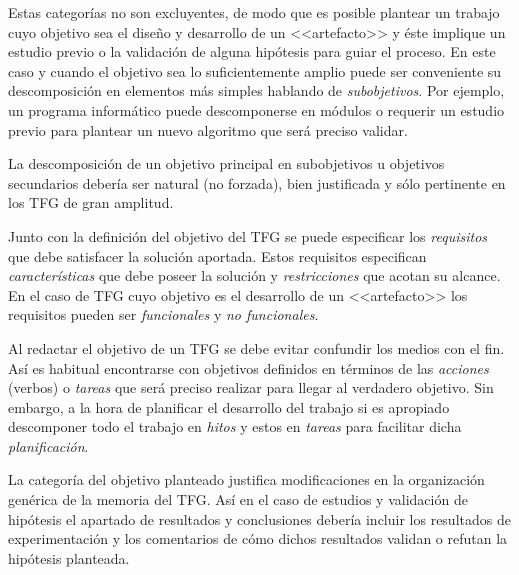 Estas categorías no son excluyentes, de modo que es posible plantear un trabajo cuyo objetivo sea el diseño y desarrollo de un <<artefacto>> y éste implique un estudio previo o la validación de alguna hipótesis para guiar el proceso. En este caso y cuando el objetivo sea lo suficientemente amplio puede ser conveniente su descomposición en elementos más simples hablando de \emph{subobjetivos}. Por ejemplo, un programa informático puede descomponerse en módulos o requerir un estudio previo para plantear un nuevo algoritmo que será preciso validar. 

La descomposición de un objetivo principal en subobjetivos u objetivos secundarios debería ser natural (no forzada), bien justificada y sólo pertinente en los TFG de gran amplitud.

Junto con la definición del objetivo del TFG se puede especificar los \emph{requisitos} que debe satisfacer la solución aportada. Estos requisitos especifican \emph{características} que debe poseer la solución y \emph{restricciones} que acotan su alcance. En el caso de TFG cuyo objetivo es el desarrollo de un <<artefacto>> los requisitos pueden ser \emph{funcionales} y \emph{no funcionales}.

Al redactar el objetivo de un TFG se debe evitar confundir los medios con el fin. Así es habitual encontrarse con objetivos definidos en términos de las \emph{acciones} (verbos) o \emph{tareas} que será preciso realizar para llegar al verdadero objetivo. Sin embargo, a la hora de planificar el desarrollo del trabajo si es apropiado descomponer todo el trabajo en \emph{hitos} y estos en \emph{tareas} para facilitar dicha \emph{planificación}.


La categoría del objetivo planteado justifica modificaciones en la organización genérica de la memoria del TFG. Así en el caso de estudios y validación de hipótesis el apartado de resultados y conclusiones debería incluir los resultados de experimentación y los comentarios de cómo dichos resultados validan o refutan la hipótesis planteada.


